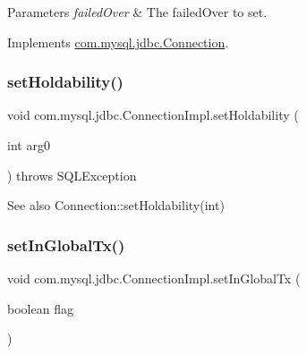 \begin{DoxyParams}{Parameters}
{\em failed\+Over} & The failed\+Over to set. \\
\hline
\end{DoxyParams}


Implements \mbox{\hyperlink{interfacecom_1_1mysql_1_1jdbc_1_1_connection_af1a58f95720963635270b83f16d558b0}{com.\+mysql.\+jdbc.\+Connection}}.

\mbox{\label{classcom_1_1mysql_1_1jdbc_1_1_connection_impl_a2256a399a6e5a89f8becf3dbe081101b}} 
\subsubsection{\texorpdfstring{set\+Holdability()}{setHoldability()}}
{\footnotesize\ttfamily void com.\+mysql.\+jdbc.\+Connection\+Impl.\+set\+Holdability (\begin{DoxyParamCaption}\item[{int}]{arg0 }\end{DoxyParamCaption}) throws S\+Q\+L\+Exception}

\begin{DoxySeeAlso}{See also}
Connection\+::set\+Holdability(int) 
\end{DoxySeeAlso}
\mbox{\label{classcom_1_1mysql_1_1jdbc_1_1_connection_impl_abbec8e30775ad9e356305f31e2219bec}} 
\subsubsection{\texorpdfstring{set\+In\+Global\+Tx()}{setInGlobalTx()}}
{\footnotesize\ttfamily void com.\+mysql.\+jdbc.\+Connection\+Impl.\+set\+In\+Global\+Tx (\begin{DoxyParamCaption}\item[{boolean}]{flag }\end{DoxyParamCaption})}

